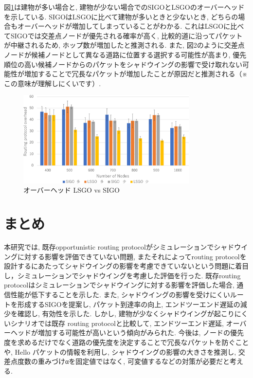 \documentclass[technicalreport]{ieicej}
\begin{document}
図\ref{fig:Overhead}は建物が多い場合と, 建物が少ない場合でのSIGOとLSGOのオーバーヘッドを示している. SIGOはLSGOに比べて建物が多いときと少ないとき, どちらの場合もオーバーヘッドが増加してしまっていることがわかる. これはLSGOに比べてSIGOでは交差点ノードが優先される確率が高く, 比較的道に沿ってパケットが中継されるため, ホップ数が増加したと推測される. また, 図2のように交差点ノードが候補ノードとして異なる道路に位置する選択する可能性が高まり, 優先順位の高い候補ノードからのパケットをシャドウイングの影響で受け取れない可能性が増加することで冗長なパケットが増加したことが原因だと推測される（※この意味が理解しにくいです）. 

 \begin{figure}[!ht]
\centering
\includegraphics[width=90mm]{figures/Overhead.eps}
\caption{オーバーヘッド LSGO vs SIGO}
\label{fig:Overhead}
\end{figure}





\section{まとめ}
本研究では, 既存opportunistic routing protocolがシミュレーションでシャドウイングに対する影響を評価できていない問題, またそれによってrouting protocolを設計するにあたってシャドウイングの影響を考慮できていないという問題に着目し，シミュレーションでシャドウイングを考慮した評価を行った. 既存routing protocolはシミュレーションでシャドウイングに対する影響を評価した場合, 通信性能が低下することを示した. また, シャドウイングの影響を受けにくいルートを形成するSIGOを提案し, パケット到達率の向上, エンドツーエンド遅延の減少を確認し, 有効性を示した. しかし, 建物が少なくシャドウイングが起こりにくいシナリオでは既存 routing protocolと比較して, エンドツーエンド遅延, オーバーヘッドが増加する可能性が高いという傾向がみられた. 今後は, ノードの優先度を求めるだけでなく道路の優先度を決定することで冗長なパケットを防ぐことや, Hello パケットの情報を利用し, シャドウイングの影響の大きさを推測し, 交差点度数の重みづけαを固定値ではなく, 可変値するなどの対策が必要だと考える. 
\end{document}
